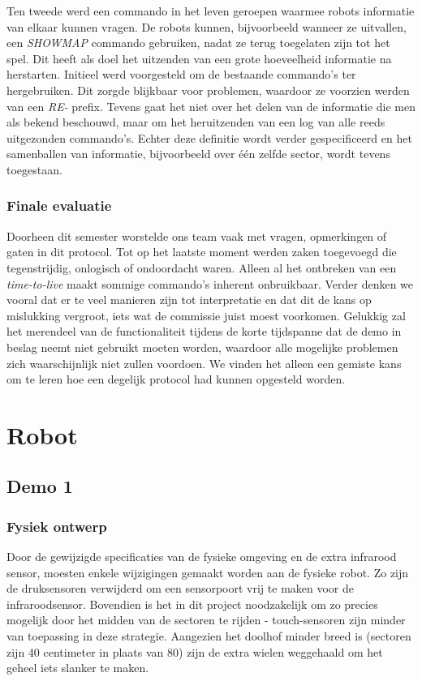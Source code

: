 \documentclass[12pt,a4paper]{report}
\begin{document}
Ten tweede werd een commando in het leven geroepen waarmee robots informatie van elkaar kunnen vragen. De robots kunnen, bijvoorbeeld wanneer ze uitvallen, een \emph{SHOWMAP} commando gebruiken, nadat ze terug toegelaten zijn tot het spel. Dit heeft als doel het uitzenden van een grote hoeveelheid informatie na herstarten. Initieel werd voorgesteld om de bestaande commando's ter hergebruiken. Dit zorgde blijkbaar voor problemen, waardoor ze voorzien werden van een \emph{RE-} prefix. Tevens gaat het niet over het delen van de informatie die men als bekend beschouwd, maar om het heruitzenden van een log van alle reeds uitgezonden commando's. Echter deze definitie wordt verder gespecificeerd en het samenballen van informatie, bijvoorbeeld over \'e\'en zelfde sector, wordt tevens toegestaan.

\subsection{Finale evaluatie}

Doorheen dit semester worstelde ons team vaak met vragen, opmerkingen of gaten in dit protocol. Tot op het laatste moment werden zaken toegevoegd die tegenstrijdig, onlogisch of ondoordacht waren.
Alleen al het ontbreken van een \emph{time-to-live} maakt sommige commando's inherent onbruikbaar. Verder denken we vooral dat er te veel manieren zijn tot interpretatie en dat dit de kans op mislukking vergroot, iets wat de commissie juist moest voorkomen. Gelukkig zal het merendeel van de functionaliteit tijdens de korte tijdspanne dat de demo in beslag neemt niet gebruikt moeten worden, waardoor alle mogelijke problemen zich waarschijnlijk niet zullen voordoen. We vinden het alleen een gemiste kans om te leren hoe een degelijk protocol had kunnen opgesteld worden.

\chapter{Robot}

\section{Demo 1}

\subsection{Fysiek ontwerp}

Door de gewijzigde specificaties van de fysieke omgeving en de extra infrarood sensor, moesten enkele wijzigingen gemaakt worden aan de fysieke robot. Zo zijn de druksensoren verwijderd om een sensorpoort vrij te maken voor de infraroodsensor. Bovendien is het in dit project noodzakelijk om zo precies mogelijk door het midden van de sectoren te rijden - touch-sensoren zijn minder van toepassing in deze strategie. Aangezien het doolhof minder breed is (sectoren zijn 40 centimeter in plaats van 80) zijn de extra wielen weggehaald om het geheel iets slanker te maken.
\end{document}
